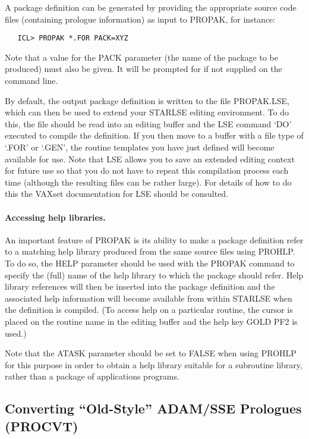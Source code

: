 A package definition can be generated by providing the appropriate source
code files (containing prologue information) as input to PROPAK, for
instance:

\begin{verbatim}
   ICL> PROPAK *.FOR PACK=XYZ
\end{verbatim}

Note that a value for the PACK parameter (the name of the package to be
produced) must also be given.
It will be prompted for if not supplied on the command line.

By default, the output package definition is written to the file PROPAK.LSE,
which can then be used to extend your STARLSE editing environment.
To do this, the file should be read into an editing buffer and the LSE
command `DO' executed to compile the definition.
If you then move to a buffer with a file type of `.FOR' or `.GEN', the
routine templates you have just defined will become available for use.
Note that LSE allows you to save an extended editing context for future use
so that you do not have to repeat this compilation process each time
(although the resulting files can be rather large).
For details of how to do this the VAXset documentation for LSE should be
consulted.

\paragraph{Accessing help libraries.}
An important feature of PROPAK is its ability to make a package definition
refer to a matching help library produced from the same source files using
PROHLP.
To do so, the HELP parameter should be used with the PROPAK command to
specify the (full) name of the help library to which the package should
refer.
Help library references will then be inserted into the package definition
and the associated help information will become available from within
STARLSE when the definition is compiled.
(To access help on a particular routine, the cursor is placed on the routine
name in the editing buffer and the help key GOLD PF2 is used.)

Note that the ATASK parameter should be set to FALSE when using PROHLP for
this purpose in order to obtain a help library suitable for a subroutine
library, rather than a package of applications programs.


\subsection{Converting ``Old-Style'' ADAM/SSE Prologues (PROCVT)}
\label{sect:procvt}

